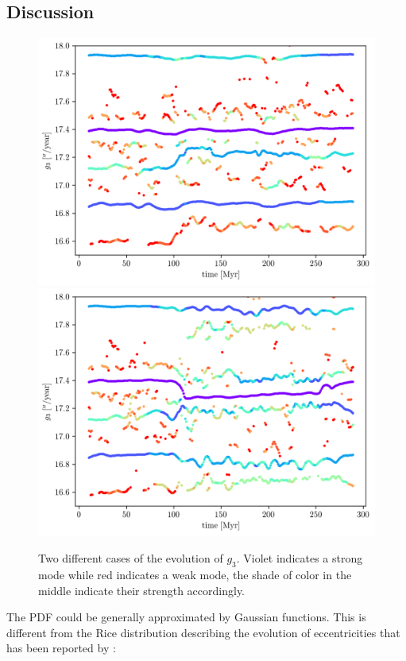 \documentclass[12pt]{article}
\begin{document}
	
	
	\subsection{Discussion} \label{sec:dis_den}
	\begin{figure}
		\centering
		\includegraphics[scale=0.55]{figures/g3_cont_1398+}%
		\includegraphics[scale=0.55]{figures/g3_cont_1401b+}%
		\caption{Two different cases of the evolution of $g_3$. Violet indicates a strong mode while red indicates a weak mode, the shade of color in the middle indicate their strength accordingly. }
		\label{fig:g_3_+}
	\end{figure}
	The PDF could be generally approximated by Gaussian functions. This is different from the Rice distribution describing the evolution of eccentricities that has been reported by \cite{laskar2008}:
\end{document}
